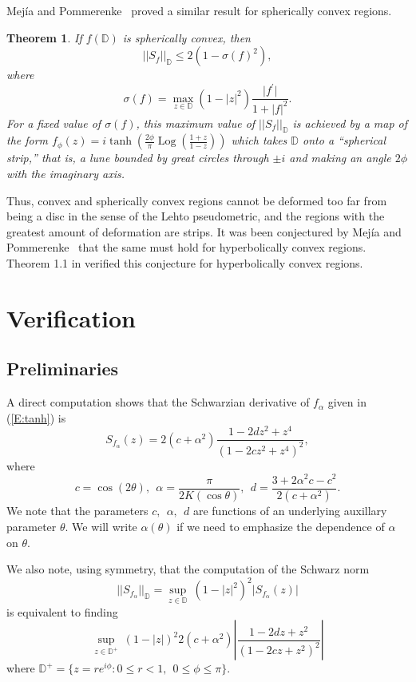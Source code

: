 \documentclass[12pt]{icgft}
\newcommand{\D}{\mathbb D}
\newcommand{\abs}[1]{\lvert#1\rvert}
\newcommand{\norm}[1]{\lvert\lvert#1\rvert\rvert}
\newcommand{\Snf}{\norm{S_f}_\D}
\newtheorem{theorem}{Theorem}[section]
\theoremstyle{definition}
\DeclareMathOperator{\Log}{Log}
\numberwithin{equation}{section}
\begin{document}
Mej\'ia and Pommerenke~\cite{MP00b} proved a similar result for spherically
convex regions.

\begin{theorem}
If $f(\D)$ is spherically convex, then
\[
\norm{S_f}_\D \leq 2(1-\sigma(f)^2),
\]
where
\[
\sigma(f)=\max_{z\in\D} (1-\abs{z}^2)\frac{\abs{f^\prime}}{1+\abs{f}^2}.
\]
For a fixed value of $\sigma(f)$, this
 maximum value of $\Snf$ is achieved by a map of the form
$f_\phi(z)=i\tanh\left(\frac{2\phi}{\pi}\Log
\left(\frac{1+z}{1-z}\right)\right)$ which takes $\D$ onto a
 ``spherical strip,'' that is, a lune bounded by great circles through
$\pm i$ and making an angle $2\phi$ with the imaginary axis.
\end{theorem}

Thus, convex and spherically convex regions cannot be deformed
 too far from being a disc
in the sense of the Lehto pseudometric, and the regions
with the greatest amount of deformation
are strips.  It was been conjectured by Mej\'ia and
Pommerenke~\cite{MP00,PM00,MP01}
that the same must hold for hyperbolically
convex regions.  Theorem 1.1 in \cite{BCPW} verified this conjecture for hyperbolically convex regions.


\section{Verification}\label{S:verify}

\subsection{Preliminaries}

A direct computation shows that the Schwarzian derivative of ${f_\alpha}$ given in (\ref{E:tanh}) is
\begin{equation*}
S_{f_\alpha}(z) =2(c+\alpha^2)\frac{1 - 2dz^2 + z^4}{(1-2cz^2 +z^4)^2},
\end{equation*}
\noindent where
$$
c = \cos(2\theta),\ \ \alpha=\frac{\pi}{2K(\cos\theta)}, \ \
d = \frac{3+2\alpha^2c-c^2}{2(c+\alpha^2)}.
$$
\noindent We note that the parameters $c, \ \ \alpha, \ \  d$ are functions
of an underlying auxillary parameter $\theta$.  We will write $\alpha(\theta)$ if we need
to emphasize the dependence of $\alpha$ on $\theta$.

We also note, using symmetry, that the computation of the Schwarz norm
$$||S_{f_\alpha}||_{\D} = \sup_{z \in \D}  \ (1-|z|^2)^2 \abs{S_{f_{\alpha}}(z)}$$
\noindent is equivalent to finding
\begin{equation} \label{e:snr}
\sup_{z \in \D^+} \  (1-|z|)^2 2(c+\alpha^2)\left|\frac{1 - 2dz + z^2}{(1-2cz +z^2)^2}\right|
\end{equation}
\noindent where $\D^+ = \{z = re^{i\phi} : 0 \le r < 1, \ \ 0 \le \phi \le \pi \}$.
\end{document}
